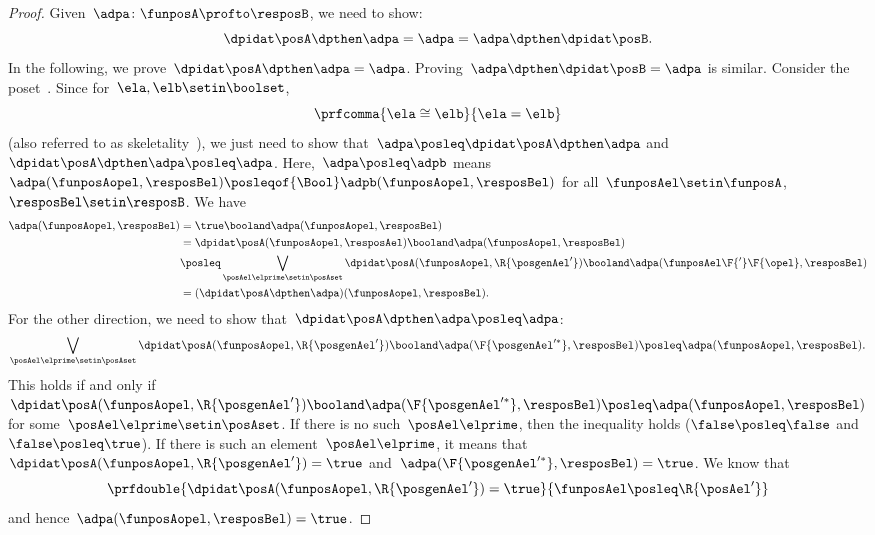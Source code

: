\begin{proof}
    Given~$\adpa\colon \funposA\profto \resposB$, we need to show:
    \begin{equation}
        \dpidat\posA \dpthen \adpa = \adpa = \adpa \dpthen \dpidat\posB.
    \end{equation}
    In the following, we prove~$\dpidat\posA \dpthen \adpa = \adpa$.
    Proving~$\adpa\dpthen \dpidat\posB=\adpa$ is similar.
    Consider the poset~\Bool.
    Since for~$\ela,\elb\setin \boolset$,
    \begin{equation}
        \prfcomma{
            \ela\cong \elb
        }{
            \ela=\elb
        }
    \end{equation}
    (also referred to as skeletality~\cite{fong2019}), we just need to show that~$\adpa\posleq \dpidat\posA\dpthen \adpa$ and~$\dpidat\posA\dpthen \adpa\posleq \adpa$.
    Here,~$\adpa\posleq \adpb$ means~$\adpa(\funposAopel,\resposBel)\posleqof{\Bool}\adpb(\funposAopel,\resposBel)$ for all~$\funposAel\setin \funposA$,~$\resposBel\setin \resposB$.
    We have
    \begin{equation}
        \label{eq:dp_unit_1}
        \begin{aligned}
            \adpa(\funposAopel,\resposBel) & =\true \booland \adpa(\funposAopel,\resposBel) \\
                                           & = \dpidat\posA(\funposAopel,\resposAel) \booland \adpa(\funposAopel,\resposBel) \\
                                           & \posleq \bigvee_{\posAel\elprime \setin \posAset}\dpidat\posA(\funposAopel,\R{\posgenAel'})\booland \adpa(\funposAel\F{'}\F{\opel},\resposBel) \\
                                           & =(\dpidat\posA\dpthen \adpa)(\funposAopel,\resposBel).
        \end{aligned}
    \end{equation}
    For the other direction, we need to show that~$\dpidat\posA\dpthen \adpa\posleq \adpa$:
    \begin{equation}
        \label{eq:dp_unit_2}
        \bigvee_{\posAel\elprime\setin \posAset}\dpidat\posA(\funposAopel,\R{\posgenAel'})\booland \adpa(\F{\posgenAel'^*},\resposBel) \posleq \adpa(\funposAopel,\resposBel).
    \end{equation}
    This holds if and only if~$\dpidat\posA(\funposAopel,\R{\posgenAel'})\booland \adpa(\F{\posgenAel'^*},\resposBel) \posleq \adpa(\funposAopel,\resposBel)$ for some~$\posAel\elprime\setin \posAset$.
    If there is no such~$\posAel\elprime$, then the inequality holds ($\false \posleq \false$ and~$\false \posleq \true$).
    If there is such an element~$\posAel\elprime$, it means that~$\dpidat\posA(\funposAopel,\R{\posgenAel'})=\true$ and~$\adpa(\F{\posgenAel'^*},\resposBel)=\true$.
    We know that
    \begin{equation}
        \prfdouble{
            \dpidat\posA(\funposAopel,\R{\posgenAel'})=\true
        }{
            \funposAel \posleq \R{\posAel'}
        }
    \end{equation}
    and hence~$\adpa(\funposAopel,\resposBel)=\true$.
\end{proof}

